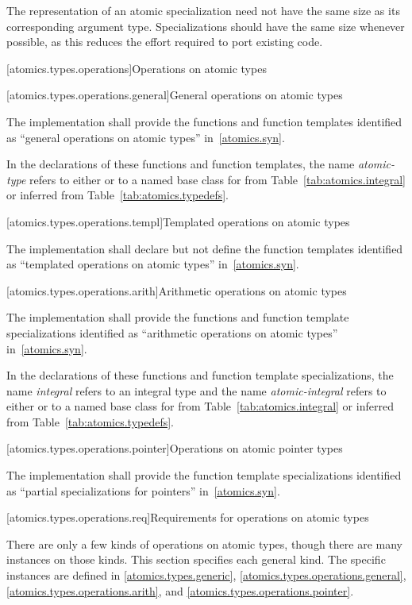 \pnum
\begin{note} The representation of an atomic specialization need not have the same size as its
corresponding argument type. Specializations should have the same size whenever possible, as
this reduces the effort required to port existing code. \end{note}

[atomics.types.operations]{Operations on atomic types}

[atomics.types.operations.general]{General operations on atomic types}

\pnum
The implementation shall provide the functions and function templates identified as ``general operations
on atomic types'' in~\ref{atomics.syn}.

\pnum
In the declarations of these functions and function templates, the name
\textit{atomic-type} refers to either  or to a named base class for 
from Table~\ref{tab:atomics.integral} or inferred from Table~\ref{tab:atomics.typedefs}.

[atomics.types.operations.templ]{Templated operations on atomic types}

\pnum
The implementation shall declare but not define the
function templates identified as ``templated operations on atomic types'' in~\ref{atomics.syn}.

[atomics.types.operations.arith]{Arithmetic operations on atomic types}

\pnum
The implementation shall provide the functions and function template specializations identified as ``arithmetic operations
on atomic types'' in~\ref{atomics.syn}.

\pnum
In the declarations of these functions and function template specializations, the name \textit{integral} refers to an
integral type and the name \textit{atomic-integral} refers to either
 or to a named base class for  from
Table~\ref{tab:atomics.integral} or inferred from Table~\ref{tab:atomics.typedefs}.

[atomics.types.operations.pointer]{Operations on atomic pointer types}

\pnum
The implementation shall provide the function template specializations
identified as ``partial specializations for pointers'' in~\ref{atomics.syn}.

[atomics.types.operations.req]{Requirements for operations on atomic types}

\pnum
There are only a few kinds of operations on atomic types, though there are many
instances on those kinds. This section specifies each general kind. The specific
instances are defined in 
\ref{atomics.types.generic}, \ref{atomics.types.operations.general},
\ref{atomics.types.operations.arith}, and \ref{atomics.types.operations.pointer}.

